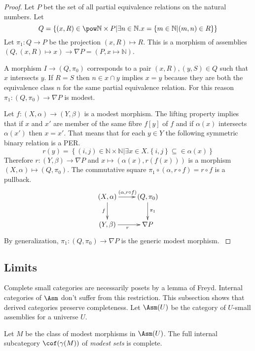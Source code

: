 \documentclass{tac}
\newcommand\set[1]{\left\{#1\right\}}
\newcommand\N{\mathbb N}
\newcommand\of{:}
\newcommand\gen\gamma
\begin{document}
\begin{proof} Let $P$ bet the set of all partial equivalence relations on the natural numbers. Let
\[Q=\set{(x,R)\in\pow\N\times P| \exists n\in \N. x = \set{ m\in \N | (m,n)\in R}}\]
Let $\pi_1\of Q\to P$ be the projection $(x,R) \mapsto R$. This is a morphism of assemblies $(Q,(x,R)\mapsto x) \to \nabla P=(P, x\mapsto \N)$.

A morphism $I\to(Q,\pi_0)$ corresponds to a pair $(x,R),(y,S)\in Q$ such that $x$ intersects $y$. If $R=S$ then $n\in x\cap y$ implies $x=y$ because they are both the equivalence class $n$ for the same partial equivalence relation. For this reason $\pi_1\of (Q,\pi_0)\to\nabla P$ is modest.

Let $f\of(X,\alpha)\to(Y,\beta)$ is a modest morphism. The lifting property implies that if $x$ and $x'$ are member of the same fibre $f[y]$ of $f$ and if $\alpha(x)$ intersects $\alpha(x')$ then $x=x'$. That means that for each $y\in Y$ the following symmetric binary relation is a PER. \[r(y) = \set{(i,j)\in \N\times\N| \exists x\in X. \set{i,j}\subseteq \in \alpha(x)}\] Therefore $r\of(Y,\beta)\to \nabla P$ and $x\mapsto (\alpha(x),r(f(x)))$ is a morphism $(X,\alpha)\mapsto(Q,\pi_0)$. The commutative square $\pi_1\circ (\alpha,r\circ f) = r\circ f$ is a pullback.
\[\xymatrix{
(X,\alpha)\ar[d]_f\ar[r]^{(\alpha,r\circ f)} & (Q,\pi_0)\ar[d]^{\pi_1}\\
(Y,\beta) \ar[r]_{r} & \nabla P
}\]
By generalization, $\pi_1\of (Q,\pi_0)\to\nabla P$ is the generic modest morphism. \label{generic modest}
\end{proof}

\subsection{Limits}
Complete small categories are necessarily posets by a lemma of Freyd. Internal categories of $\Asm$ don't suffer from this restriction. This subsection shows that derived categories preserve completeness. Let $\Asm(U)$ be the category of $U$-small assemblies for a universe $U$.

\begin{proposition} Let $M$ be the class of modest morphisms in $\Asm(U)$. The full internal subcategory $\cof(\gen(M))$ of \emph{modest sets} is complete. \end{proposition}
\end{document}
